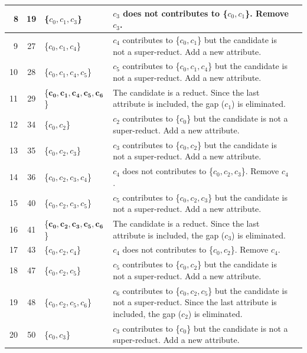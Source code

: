 \documentclass[number,preprint,review,12pt]{elsarticle}
\begin{document}
\begin{table}[!htb]
\begin{tabular}{|c|c|l|l|l|}
		~8 & 19 & \{$c_0,c_1,c_3$\}			& \multicolumn{1}{p{8.5cm}|}{$c_3$ does not contributes to \{$c_0,c_1$\}. Remove $c_3$.}\\
				\hline
		~9 & 27 & \{$c_0,c_1,c_4$\}			& \multicolumn{1}{p{8.5cm}|}{$c_4$ contributes to \{$c_0,c_1$\} but the candidate is not a super-reduct. Add a new attribute.}\\
				\hline
		10 & 28 & \{$c_0,c_1,c_4,c_5$\}		& \multicolumn{1}{p{8.5cm}|}{$c_5$ contributes to \{$c_0,c_1,c_4$\} but the candidate is not a super-reduct. Add a new attribute.}\\
				\hline
		11 & 29 & \{$\mathbf{c_0,c_1,c_4,c_5,c_6}$\} & \multicolumn{1}{p{8.5cm}|}{The candidate is a reduct. Since the last attribute is included, the gap ($c_1$) is eliminated.}\\
				\hline
		12 & 34 & \{$c_0,c_2$\}				& \multicolumn{1}{p{8.5cm}|}{$c_2$ contributes to \{$c_0$\} but the candidate is not a super-reduct. Add a new attribute.}\\
				\hline
		13 & 35 & \{$c_0,c_2,c_3$\}	    	& \multicolumn{1}{p{8.5cm}|}{$c_3$ contributes to \{$c_0,c_2$\} but the candidate is not a super-reduct. Add a new attribute.}\\
				\hline
		14 & 36 & \{$c_0,c_2,c_3,c_4$\}		& \multicolumn{1}{p{8.5cm}|}{$c_4$ does not contributes to \{$c_0,c_2,c_3$\}. Remove $c_4$.}\\
				\hline
		15 & 40 & \{$c_0,c_2,c_3,c_5$\}		& \multicolumn{1}{p{8.5cm}|}{$c_5$ contributes to \{$c_0,c_2,c_3$\} but the candidate is not a super-reduct. Add a new attribute.}\\
				\hline
		16 & 41 & \{$\mathbf{c_0,c_2,c_3,c_5,c_6}$\} & \multicolumn{1}{p{8.5cm}|}{The candidate is a reduct. Since the last attribute is included, the gap ($c_3$) is eliminated.}\\
				\hline
		17 & 43 & \{$c_0,c_2,c_4$\}			& \multicolumn{1}{p{8.5cm}|}{$c_4$ does not contributes to \{$c_0,c_2$\}. Remove $c_4$.}\\
				\hline
		18 & 47 & \{$c_0,c_2,c_5$\}			& \multicolumn{1}{p{8.5cm}|}{$c_5$ contributes to \{$c_0,c_2$\} but the candidate is not a super-reduct. Add a new attribute.}\\
				\hline
		19 & 48 & \{$c_0,c_2,c_5,c_6$\}		& \multicolumn{1}{p{8.5cm}|}{$c_6$ contributes to \{$c_0,c_2,c_5$\} but the candidate is not a super-reduct. Since the last attribute is included, the gap ($c_2$) is eliminated.}\\
				\hline
		20 & 50 & \{$c_0,c_3$\}				& \multicolumn{1}{p{8.5cm}|}{$c_3$ contributes to \{$c_0$\} but the candidate is not a super-reduct. Add a new attribute.}\\    

\end{tabular}
\end{table}
\end{document}
